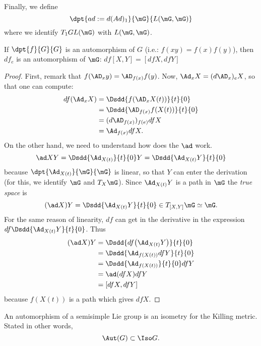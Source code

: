 Finally, we define
\[
 \dpt{ad:=d(Ad)_1}{\mG}{L(\mG,\mG)}
\]
 where we identify $T_1GL(\mG)$ with $L(\mG,\mG)$.

\begin{lemma}\label{LEMooEALFooJOeOgk}
    If $\dpt{f}{G}{G}$ is an automorphism of $G$ (i.e.: $f(xy)=f(x)f(y)$), then $df_e$ is an automorphism of $\mG$: $df[X,Y]=[df X,dfY]$
\end{lemma}

\begin{proof}
First, remark that $f(\AD_xy)=\AD_{f(x)}f(y)$. Now, $\Ad_x X=(d\AD_x)_eX$, so that one can compute:
\begin{equation}
\begin{split}
   df(\Ad_xX)&=\Dsdd{f(\AD_xX(t))}{t}{0}\\
             &=\Dsdd{   \AD_{f(x)}f(X(t))  }{t}{0}\\
	     &=(d\AD_{f(x)})_{f(e)}df X\\
	     &=\Ad_{f(x)}df X.
\end{split}
\end{equation}
On the other hand, we need to understand how does the $\ad$ work.
\[
  \ad XY=\Dsdd{\Ad_{X(t)}}{t}{0}Y=\Dsdd{\Ad_{X(t)}Y}{t}{0}
\]
because $\dpt{\Ad_{X(t)}}{\mG}{\mG}$ is linear, so that $Y$ can enter the derivation (for this, we identify $\mG$ and $T_X\mG$). Since $\Ad_{X(t)}Y$ is a path in $\mG$ the \emph{true space} is
\[
(\ad X)Y=\Dsdd{ \Ad_{X(t)}Y }{t}{0}\in T_{[X,Y]}\mG\simeq\mG.
\]
For the same reason of linearity, $df$ can get in the derivative in the expression $df\Dsdd{  \Ad_{X(t)}Y  }{t}{0}$. Thus
\begin{equation}
\begin{split}
(\ad X)Y&=\Dsdd{  df\big(\Ad_{X(t)}Y\big)  }{t}{0}\\
        &=\Dsdd{  \Ad_{ f(X(t)) }df Y  }{t}{0}\\
	&=\Dsdd{ \Ad_{f(X(t))} }{t}{0}df Y\\
	&=\ad(dfX)df Y\\
	&=[dfX,df Y]
\end{split}
\end{equation}
because $f(X(t))$ is a path which gives $df X$.
\end{proof}

\begin{corollary}
An automorphism of a semisimple Lie group is an isometry for the Killing metric. Stated in other words,
    \begin{equation}\label{eq:Aut_Iso}
        \Aut(G)\subset\Iso G.
    \end{equation}
\end{corollary}

